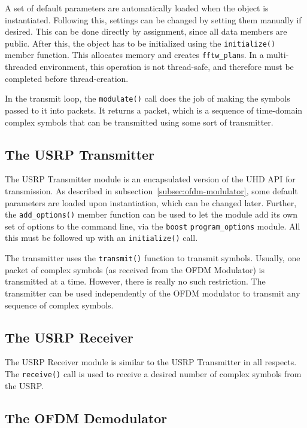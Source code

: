 A set of default parameters are automatically loaded when the object is
instantiated. Following this, settings can be changed by setting them manually
if desired. This can be done directly by assignment, since all data members are
public. After this, the object has to be initialized using the
\lstinline!initialize()! member function. This allocates memory and creates
\lstinline!fftw_plan!s. In a multi-threaded environment, this operation is not
thread-safe, and therefore must be completed before thread-creation.

In the transmit loop, the \lstinline!modulate()! call does the job of making
the symbols passed to it into packets. It returns a packet, which is a sequence
of time-domain complex symbols that can be transmitted using some sort of
transmitter.

\subsection{The USRP Transmitter}
\label{subsec:usrp-transmitter}

The USRP Transmitter module is an encapsulated version of the UHD API for
transmission. As described in subsection~\ref{subsec:ofdm-modulator}, some
default parameters are loaded upon instantiation, which can be changed later.
Further, the \lstinline!add_options()! member function can be used to let the
module add its own set of options to the command line, via the
\lstinline!boost! \lstinline!program_options! module. All this must be
followed up with an \lstinline!initialize()! call.

The transmitter uses the \lstinline!transmit()! function to transmit symbols.
Usually, one packet of complex symbols (as received from the OFDM Modulator) is
transmitted at a time. However, there is really no such restriction. The
transmitter can be used independently of the OFDM modulator to transmit any
sequence of complex symbols.

\subsection{The USRP Receiver}
\label{subsec:usrp-receiver}

The USRP Receiver module is similar to the USRP Transmitter in all respects.
The \lstinline!receive()! call is used to receive a desired number of complex
symbols from the USRP.

\subsection{The OFDM Demodulator}

